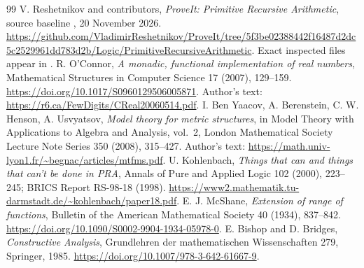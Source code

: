 \documentclass[11pt,a4paper]{article}
\numberwithin{equation}{section}
\theoremstyle{definition}
\theoremstyle{remark}\newtheorem{remark}[theorem]{Remark}
\begin{document}
\begin{thebibliography}{99}
 V. Reshetnikov and contributors, \emph{ProveIt: Primitive Recursive Arithmetic}, source baseline , 20 November 2026. \url{https://github.com/VladimirReshetnikov/ProveIt/tree/5f3be02388442f16487d2dc5c2529961dd783d2b/Logic/PrimitiveRecursiveArithmetic}. Exact inspected files appear in .
 R. O'Connor, \emph{A monadic, functional implementation of real numbers}, Mathematical Structures in Computer Science 17 (2007), 129--159. \url{https://doi.org/10.1017/S0960129506005871}. Author's text: \url{https://r6.ca/FewDigits/CReal20060514.pdf}.
 I. Ben Yaacov, A. Berenstein, C. W. Henson, A. Usvyatsov, \emph{Model theory for metric structures}, in Model Theory with Applications to Algebra and Analysis, vol.~2, London Mathematical Society Lecture Note Series 350 (2008), 315--427. Author's text: \url{https://math.univ-lyon1.fr/~begnac/articles/mtfms.pdf}.
 U. Kohlenbach, \emph{Things that can and things that can't be done in PRA}, Annals of Pure and Applied Logic 102 (2000), 223--245; BRICS Report RS-98-18 (1998). \url{https://www2.mathematik.tu-darmstadt.de/~kohlenbach/paper18.pdf}.
 E. J. McShane, \emph{Extension of range of functions}, Bulletin of the American Mathematical Society 40 (1934), 837--842. \url{https://doi.org/10.1090/S0002-9904-1934-05978-0}.
 E. Bishop and D. Bridges, \emph{Constructive Analysis}, Grundlehren der mathematischen Wissenschaften 279, Springer, 1985. \url{https://doi.org/10.1007/978-3-642-61667-9}.
\end{thebibliography}
\end{document}
